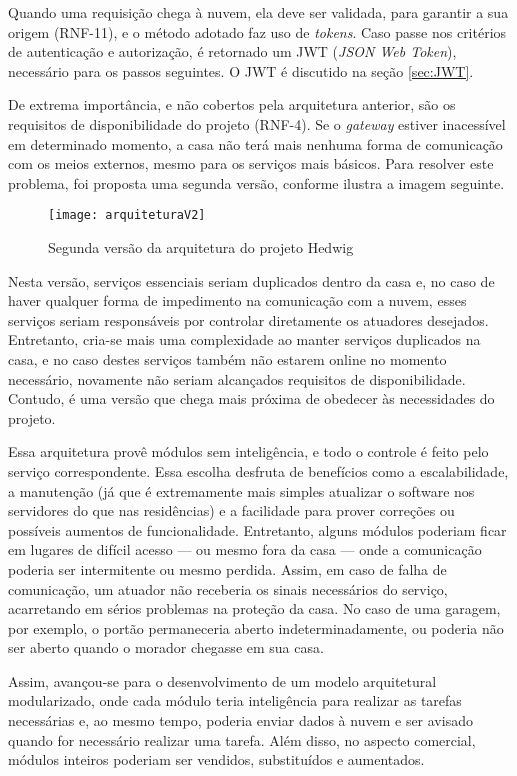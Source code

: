 Quando uma requisição chega à nuvem, ela deve ser validada, para garantir a sua origem (RNF-11), e o método adotado faz uso de \emph{tokens}.  Caso passe nos critérios de autenticação e autorização, é retornado um JWT (\textit{JSON Web Token}), necessário para os passos seguintes. O JWT é discutido na seção \ref{sec:JWT}.

De extrema importância, e não cobertos pela arquitetura anterior, são os requisitos de disponibilidade do projeto (RNF-4). Se o \textit{gateway} estiver inacessível em determinado momento, a casa não terá mais nenhuma forma de comunicação com os meios externos, mesmo para os serviços mais básicos. Para resolver este problema, foi proposta uma segunda versão, conforme ilustra a imagem seguinte.

\begin{figure}[H]
	\centering
	\caption{Segunda versão da arquitetura do projeto Hedwig}
  \texttt{[image: arquiteturaV2]}
\label{fig:arquiteturaV2}
\end{figure}

Nesta versão, serviços essenciais seriam duplicados dentro da casa e, no caso de haver qualquer forma de impedimento na comunicação com a nuvem, esses serviços seriam responsáveis por controlar diretamente os atuadores desejados. Entretanto, cria-se mais uma complexidade ao manter serviços duplicados na casa, e no caso destes serviços também não estarem online no momento necessário, novamente não seriam alcançados requisitos de disponibilidade. Contudo, é uma versão que chega mais próxima de obedecer às necessidades do projeto.

Essa arquitetura provê módulos sem inteligência, e todo o controle é feito pelo serviço correspondente. Essa escolha desfruta de benefícios como a escalabilidade, a manutenção (já que é extremamente mais simples atualizar o software nos servidores do que nas residências) e a facilidade para prover correções ou possíveis aumentos de funcionalidade. Entretanto, alguns módulos poderiam ficar em lugares de difícil acesso --- ou mesmo fora da casa --- onde a comunicação poderia ser intermitente ou mesmo perdida. Assim, em caso de falha de comunicação, um atuador não receberia os sinais necessários do serviço, acarretando em sérios problemas na proteção da casa. No caso de uma garagem, por exemplo, o portão permaneceria aberto indeterminadamente, ou poderia não ser aberto quando o morador chegasse em sua casa.

Assim, avançou-se para o desenvolvimento de um modelo arquitetural modularizado, onde cada módulo teria inteligência para realizar as tarefas necessárias e, ao mesmo tempo, poderia enviar dados à nuvem e ser avisado quando for necessário realizar uma tarefa. Além disso, no aspecto comercial, módulos inteiros poderiam ser vendidos, substituídos e aumentados.

